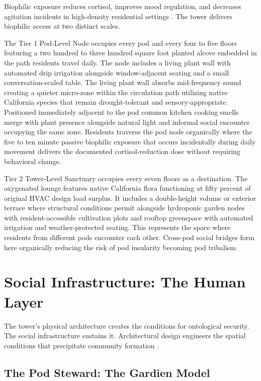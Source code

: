 \documentclass[12pt, letterpaper]{article}
\begin{document}
Biophilic exposure reduces cortisol, improves mood regulation, and decreases agitation incidents in high-density residential settings \citep{grand_rising_bh_2024, imeg_biophilic_2024}. The tower delivers biophilic access at two distinct scales.

The Tier 1 Pod-Level Node occupies every pod and every four to five floors featuring a two hundred to three hundred square foot planted alcove embedded in the path residents travel daily. The node includes a living plant wall with automated drip irrigation alongside window-adjacent seating and a small conversation-scaled table. The living plant wall absorbs mid-frequency sound creating a quieter micro-zone within the circulation path utilizing native California species that remain drought-tolerant and sensory-appropriate. Positioned immediately adjacent to the pod common kitchen cooking smells merge with plant presence alongside natural light and informal social encounter occupying the same zone. Residents traverse the pod node organically where the five to ten minute passive biophilic exposure that occurs incidentally during daily movement delivers the documented cortisol-reduction dose without requiring behavioral change.

Tier 2 Tower-Level Sanctuary occupies every seven floors as a destination. The oxygenated lounge features native California flora functioning at fifty percent of original HVAC design load surplus. It includes a double-height volume or exterior terrace where structural conditions permit alongside hydroponic garden nodes with resident-accessible cultivation plots and rooftop greenspace with automated irrigation and weather-protected seating. This represents the space where residents from different pods encounter each other. Cross-pod social bridges form here organically reducing the risk of pod insularity becoming pod tribalism.

\clearpage
\section{Social Infrastructure: The Human Layer}

The tower's physical architecture creates the conditions for ontological security. The social infrastructure sustains it. Architectural design engineers the spatial conditions that precipitate community formation \citep{frontiers_acoustic_2024}.

\subsection{The Pod Steward: The Gardien Model}
\end{document}
